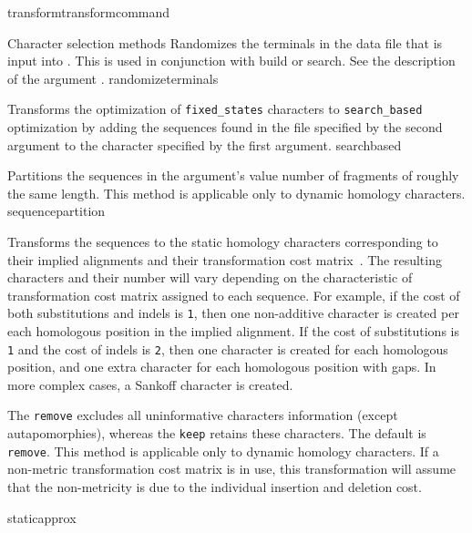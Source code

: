 \begin{command}{transform}{transformcommand}
\begin{arguments}
\begin{argumentgroup}{Character selection methods}
        {Randomizes the terminals in the data file that is input into \poy.  This is used in conjunction with 
        build or search. See the description of the argument .}
        {randomizeterminals}
        
        {Transforms the optimization of \texttt{fixed\_states} characters to \texttt{search\_based}
        optimization \cite{wheeler2003b} by adding the sequences found in the file specified by the second 
        argument to the character specified by the first argument.}
        {searchbased}
        
            {Partitions the sequences in the argument's value number of
            fragments of roughly the same length. This method is applicable only to dynamic homology characters.}
            {sequencepartition}

            {Transforms the sequences to the static homology characters
            corresponding to their implied alignments and their transformation
            cost matrix~\cite{wheeler2003}. The resulting characters and their number will vary
            depending on the characteristic of transformation cost matrix
            assigned to each sequence. For example, if the cost of both substitutions
            and indels is \texttt{1}, then one non-additive character is created per
            each homologous position in the implied alignment. If the cost of
            substitutions is \texttt{1} and the cost of indels  is \texttt{2}, then
            one character is created for each homologous position, and one extra character for
            each homologous position with gaps. In more complex cases, a Sankoff character is
            created.
            
            The \poylident  \texttt{remove} excludes all uninformative characters
            information (except autapomorphies), whereas the \poylident \texttt{keep}
            retains these characters. The default is \texttt{remove}. This
            method is applicable only to dynamic homology characters. If
            a non-metric transformation cost matrix is in use, this
            transformation will assume that the non-metricity is due to the
            individual insertion and deletion cost.}
            {staticapprox}


\end{argumentgroup}
\end{arguments}
\end{command}
